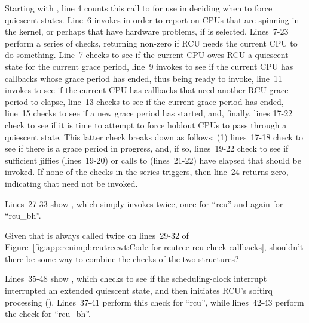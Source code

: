 Starting with , line 4 counts this call to
 for use in deciding when to force quiescent states.
Line~6 invokes  in order to report on CPUs
that are spinning in the kernel, or perhaps that have hardware problems,
if  is selected.
Lines~7-23 perform a series of checks, returning non-zero if RCU
needs the current CPU to do something.
Line~7 checks to see if the current CPU owes RCU a quiescent state for the
current grace period,
line~9 invokes  to see if
the current CPU has callbacks whose grace period has ended, thus being
ready to invoke,
line~11 invokes  to see if the current
CPU has callbacks that need another RCU grace period to elapse,
line~13 checks to see if the current grace period has ended,
line~15 checks to see if a new grace period has started,
and, finally, lines 17-22 check to see if it is time to attempt
to force holdout CPUs to pass through a quiescent state.
This latter check breaks down as follows: (1) lines~17-18 check to see
if there is a grace period in progress, and, if so, lines~19-22
check to see if sufficient jiffies (lines~19-20) or calls to
 (lines~21-22) have elapsed that
 should be invoked.
If none of the checks in the series triggers, then line~24 returns
zero, indicating that  need not be invoked.

Lines~27-33 show , which simply invokes
 twice, once for ``rcu'' and again for
``rcu\_bh''.

\QuickQuiz{}
	Given that  is always called twice
	on lines~29-32 of
	Figure~\ref{fig:app:rcuimpl:rcutreewt:Code for rcutree rcu-check-callbacks},
	shouldn't there be some way to combine the checks of the
	two structures?
 \QuickQuizEnd

Lines~35-48 show , which checks to see
if the scheduling-clock interrupt interrupted an extended quiescent
state, and then initiates RCU's softirq processing
().
Lines~37-41 perform this check for ``rcu'', while lines~42-43
perform the check for ``rcu\_bh''.

